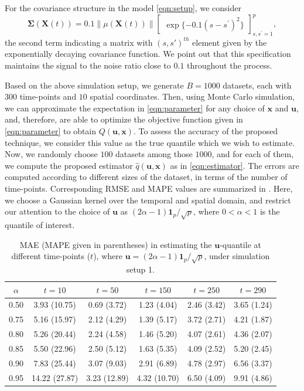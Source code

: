 \documentclass[aos]{imsart}
\theoremstyle{plain}
\theoremstyle{remark}
\newcommand{\dash}{^{\prime}}
\newcommand{\bb}[1]{\boldsymbol{#1}}
\begin{document}
For the covariance structure in the model \eqref{eqn:setup}, we consider  
\begin{equation*}
    \bb{\Sigma}(\bb{X}(t)) = 0.1 \left\| \mu(\bb{X}(t))\right\| \begin{bmatrix}
        \exp\{-0.1(s - s\dash)^2\}
    \end{bmatrix}_{s, s\dash = 1}^p,
\end{equation*}
the second term indicating a matrix with $(s,s')^{th}$ element given by the exponentially decaying covariance function. We point out that this specification maintains the signal to the noise ratio close to $0.1$ throughout the process.

Based on the above simulation setup, we generate $B = 1000$ datasets, each with $300$ time-points and $10$ spatial coordinates. Then, using Monte Carlo simulation, we can approximate the expectation in \eqref{eqn:parameter} for any choice of $\bb{x}$ and $\bb{u}$, and, therefore, are able to optimize the objective function given in \eqref{eqn:parameter} to obtain $Q(\bb{u} ,\bb{x})$. To assess the accuracy of the proposed technique, we consider this value as the true quantile which we wish to estimate. Now, we randomly choose $100$ datasets among those $1000$, and for each of them, we compute the proposed estimator $\hat{q}(\bb{u} ,\bb{x})$ as in \eqref{eqn:estimator}. The errors are computed according to different sizes of the dataset, in terms of the number of time-points. Corresponding RMSE and MAPE values are summarized in . Here, we choose a Gaussian kernel over the temporal and spatial domain, and restrict our attention to the choice of $\bb{u}$ as $(2\alpha - 1)\bb{1}_p/\sqrt{p}$, where $0 < \alpha < 1$ is the quantile of interest.

\begin{table}[ht]
\centering
\caption{MAE (MAPE given in parentheses) in estimating the $\bb{u}$-quantile at different time-points ($t$), where $\bb{u}=(2\alpha - 1)\bb{1}_p/\sqrt{p}$, under simulation setup 1.}
\label{tab:sim-S1-RMSE}
\begin{tabular}{cccccc}
  \toprule
 $\alpha$ & $t=10$ & $t=50$ & $t=150$ & $t=250$ & $t=290$ \\ 
  \midrule
  0.50 & 3.93 (10.75) & 0.69 (3.72) & 1.23 (4.04)  & 2.46 (3.42) & 3.65 (1.24) \\ 
  0.75 & 5.16 (15.97) & 2.12 (4.29) & 1.39 (5.17) & 3.72 (2.71) & 4.21 (1.87) \\ 
  0.80 & 5.26 (20.44) & 2.24 (4.58) & 1.46 (5.20) & 4.07 (2.61) & 4.36 (2.07) \\ 
  0.85 & 5.50 (22.96) & 2.50 (5.12) & 1.63 (5.35) & 4.09 (2.52) & 5.20 (2.45) \\ 
  0.90 & 7.83 (25.44) & 3.07 (9.03) & 2.91 (6.89) & 4.78 (2.97) & 6.56 (3.37) \\ 
   0.95 & 14.22 (27.87) & 3.23 (12.89) & 4.32 (10.70) & 6.50 (4.09) & 9.91 (4.86) \\ 
   \bottomrule
\end{tabular}
\end{table}
\end{document}
